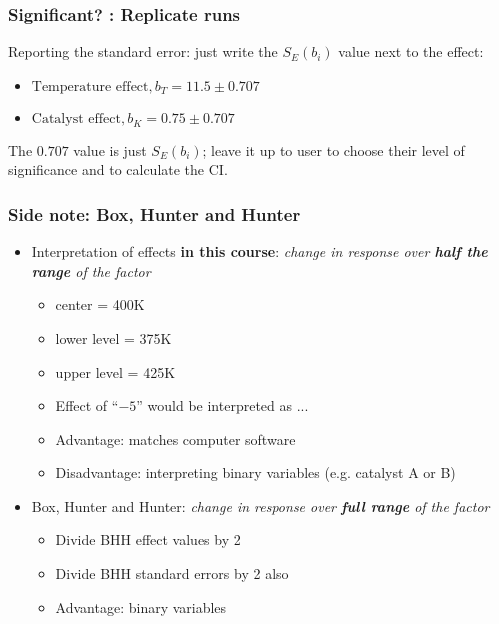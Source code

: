 \begin{frame}\frametitle{Significant? : Replicate runs}

	Reporting the standard error: just write the $S_E(b_i)$ value next to the effect:
	\begin{itemize}
		\item	$\text{Temperature effect}, b_T = 11.5 \pm 0.707$
		\item	$\text{Catalyst effect}, b_K = 0.75 \pm 0.707$
	\end{itemize}

	The $0.707$ value is just $S_E(b_i)$; leave it up to user to choose their level of significance and to calculate the CI.
\end{frame}

\begin{frame}\frametitle{Side note: Box, Hunter and Hunter}
	\begin{itemize}
		\item	Interpretation of effects \textbf{in this course}: \emph{change in response over \textbf{half the range} of the factor}
		\begin{itemize}
			\item	center = 400K
			\item	lower level = 375K
			\item	upper level = 425K
			\item	Effect of ``$-5$'' would be interpreted as ...
			\item	Advantage: matches computer software
			\item	Disadvantage: interpreting binary variables (e.g. catalyst A or B)
		\end{itemize}
	\end{itemize}
	\begin{itemize}
		\item	Box, Hunter and Hunter: \emph{change in response over \textbf{full range} of the factor}
		\begin{itemize}
			\item	Divide BHH effect values by 2
			\item	Divide BHH standard errors by 2 also
			\item	Advantage: binary variables
		\end{itemize}
	\end{itemize}
\end{frame}

